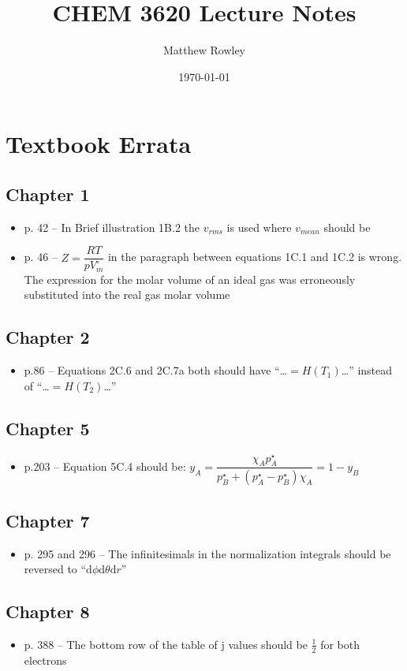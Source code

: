 \documentclass[12pt, openany, letterpaper]{memoir}
\begin{document}
\title{CHEM 3620 Lecture Notes}
\author{Matthew Rowley}
\date{\today}
\mainmatter
\maketitle
\chapter*{Textbook Errata}
\section*{Chapter 1}
\begin{itemize}
	\item p. 42 -- In Brief illustration 1B.2 the $v_{rms}$ is used where $v_{mean}$ should be
	\item p. 46 -- $Z = \dfrac{RT}{pV_m^\circ}$ in the paragraph between equations 1C.1 and 1C.2 is wrong. The expression for the molar volume of an ideal gas was erroneously substituted into the real gas molar volume
\end{itemize}
\section*{Chapter 2}
\begin{itemize}
	\item p.86 -- Equations 2C.6 and 2C.7a both should have ``\ldots$=H(T_1)$\ldots''  instead of ``\ldots$=H(T_2)$\ldots''
\end{itemize}
\section*{Chapter 5}
\begin{itemize}
	\item p.203 -- Equation 5C.4 should be: $y_A = \dfrac{\chi_Ap^\star_A}{p^\star_B+\left(p^\star_A-p^\star_B\right)\chi_A} = 1-y_B$
\end{itemize}
\section*{Chapter 7}
\begin{itemize}
	\item p. 295 and 296 -- The infinitesimals in the normalization integrals should be reversed to “$\mathrm{d}\phi\mathrm{d}\theta\mathrm{d}r$”
\end{itemize}
\section*{Chapter 8}
\begin{itemize}
	\item p. 388 -- The bottom row of the table of j values should be $\frac{1}{2}$ for both electrons
\end{itemize}
\end{document}
